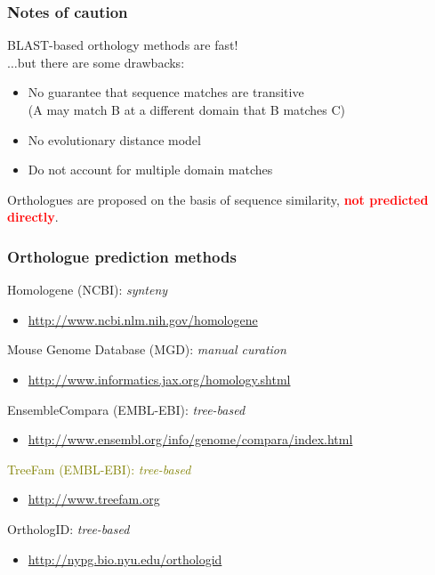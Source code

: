 
% 
\begin{frame}
  \frametitle{Notes of caution}
  \textcolor{hutton_green}{BLAST-based orthology methods are fast!} \\
  $\ldots$but there are some drawbacks:
  \begin{itemize}
    \item No guarantee that sequence matches are transitive \\
    (A may match B at a different domain that B matches C)
    \item \textcolor{hutton_blue}{No evolutionary distance model}
    \item \textcolor{hutton_purple}{Do not account for multiple domain matches}
  \end{itemize}
  Orthologues are proposed on the basis of sequence similarity, \textcolor{red}{\textbf{not predicted directly}}.
\end{frame}

% 
\begin{frame}
  \frametitle{Orthologue prediction methods}
  \textcolor{hutton_green}{Homologene (NCBI): \textit{synteny}}
  \begin{itemize}
    \item \href{http://www.ncbi.nlm.nih.gov/homologene}{http://www.ncbi.nlm.nih.gov/homologene}
  \end{itemize}
  \textcolor{hutton_blue}{Mouse Genome Database (MGD): \textit{manual curation}}
  \begin{itemize}
    \item \href{http://www.informatics.jax.org/homology.shtml}{http://www.informatics.jax.org/homology.shtml}
  \end{itemize}
  \textcolor{RawSienna}{EnsembleCompara (EMBL-EBI): \textit{tree-based}}
  \begin{itemize}
    \item \href{http://www.ensembl.org/info/genome/compara/index.html}{http://www.ensembl.org/info/genome/compara/index.html}
  \end{itemize}
  \textcolor{olive}{TreeFam (EMBL-EBI): \textit{tree-based}}
  \begin{itemize}
    \item \href{http://www.treefam.org}{http://www.treefam.org}
  \end{itemize}
  \textcolor{hutton_purple}{OrthologID: \textit{tree-based}}
  \begin{itemize}
    \item \href{http://nypg.bio.nyu.edu/orthologid}{http://nypg.bio.nyu.edu/orthologid}
  \end{itemize}
\end{frame}